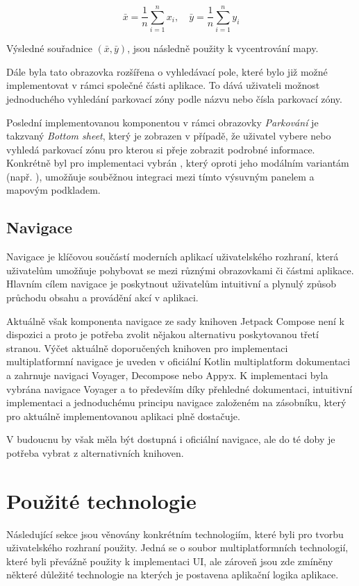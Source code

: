 \[
\bar{x} = \frac{1}{n} \sum_{i=1}^{n} x_i, \quad \bar{y} = \frac{1}{n} \sum_{i=1}^{n} y_i
\]

Výsledné souřadnice $(\bar{x},\bar{y})$, jsou následně použity k vycentrování mapy.

\bigskip

Dále byla tato obrazovka rozšířena o vyhledávací pole, které bylo již možné implementovat v rámci společné části aplikace. 
To dává uživateli možnost jednoduchého vyhledání parkovací zóny podle názvu nebo čísla parkovací zóny.

Poslední implementovanou komponentou v rámci obrazovky \textit{Parkování} je takzvaný \textit{Bottom sheet}, který je zobrazen v případě, 
že uživatel vybere nebo vyhledá parkovací zónu pro kterou si přeje zobrazit podrobné informace. Konkrétně byl pro implementaci vybrán 
, který oproti jeho modálním variantám (např. ), umožňuje souběžnou integraci mezi tímto
 výsuvným panelem a mapovým podkladem.


\subsection{Navigace}
Navigace je klíčovou součástí moderních aplikací uživatelského rozhraní, která uživatelům umožňuje pohybovat se mezi různými obrazovkami či 
částmi aplikace. Hlavním cílem navigace je poskytnout uživatelům intuitivní a plynulý způsob průchodu obsahu a provádění akcí v aplikaci. 

Aktuálně však komponenta navigace ze sady knihoven Jetpack Compose není k dispozici a proto je potřeba zvolit nějakou alternativu poskytovanou
třetí stranou. \cite{composeNav} Výčet aktuálně doporučených knihoven pro implementaci multiplatformní navigace je uveden v oficiální Kotlin 
multiplatform dokumentaci a zahrnuje navigaci Voyager, Decompose nebo Appyx. K implementaci byla vybrána navigace Voyager a 
to především díky přehledné dokumentaci, intuitivní implementaci a jednoduchému principu navigace založeném na zásobníku, který pro aktuálně
implementovanou aplikaci plně dostačuje.

V budoucnu by však měla být dostupná i oficiální navigace, ale do té doby je potřeba vybrat z alternativních knihoven.

\section{Použité technologie}
Následující sekce jsou věnovány konkrétním technologiím, které byli pro tvorbu uživatelského rozhraní použity.
Jedná se o soubor multiplatformních technologií, které byli převážně použity k implementaci UI, ale zároveň jsou zde zmíněny některé 
důležité technologie na kterých je postavena aplikační logika aplikace.

